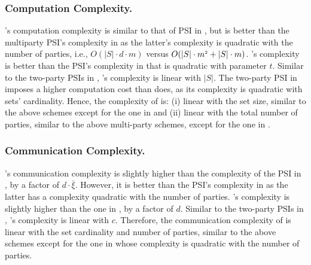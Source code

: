 \subsubsection{Computation Complexity.} \epsi's computation complexity is similar to that of PSI in \cite{AbadiDMT22}, but is better than the multiparty PSI's complexity in \cite{DBLP:conf/ccs/KolesnikovMPRT17} as  the latter's complexity is quadratic with the number of parties, i.e., $O(|S|\cdot d\cdot m)$ versus $O(|S|\cdot m^{\scriptscriptstyle 2}+|S|\cdot m )$. \epsi's complexity  is better than the PSI's complexity in   \cite{NevoTY21}  that is quadratic with parameter $t$. Similar to the two-party PSIs in \cite{DebnathD16,RaghuramanR22}, \epsi's complexity is linear with $|S|$.  The two-party PSI in \cite{DBLP:conf/dbsec/DongCCR13} imposes a higher computation cost than \epsi does, as its complexity is quadratic with sets' cardinality. Hence, the complexity of \epsi is: (i) linear with the set size, similar to the above schemes except for the one in \cite{DBLP:conf/dbsec/DongCCR13} and (ii) linear with the total number of parties, similar to  the above multi-party schemes, except for the one in \cite{DBLP:conf/ccs/KolesnikovMPRT17}. 
%

\vspace{-5mm}
\subsubsection{Communication Complexity.}  \epsi's communication complexity is slightly higher than the complexity of the PSI in \cite{AbadiDMT22}, by a factor of $d\cdot \bar\xi$. However, it is better than the  PSI's complexity in \cite{DBLP:conf/ccs/KolesnikovMPRT17} as the latter has a complexity quadratic with the number of parties. \epsi's complexity is slightly higher than the one in \cite{NevoTY21}, by a factor of $d$. Similar to the two-party PSIs in  \cite{DebnathD16,RaghuramanR22,DBLP:conf/dbsec/DongCCR13}, \epsi's complexity is linear with $c$. 
%
Therefore, the communication complexity of \epsi is linear with the set cardinality and number of parties, similar to the above schemes except for the one in \cite{DBLP:conf/ccs/KolesnikovMPRT17} whose complexity is quadratic with the number of parties. 

